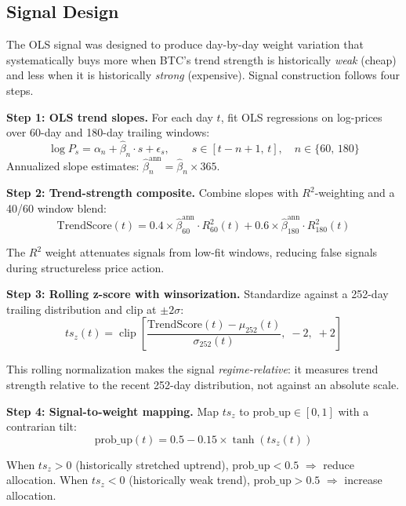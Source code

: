 \documentclass[11pt,letterpaper]{article}
\begin{document}
\subsection{Signal Design}

The OLS signal was designed to produce day-by-day weight variation that
systematically buys more when BTC's trend strength is historically \emph{weak}
(cheap) and less when it is historically \emph{strong} (expensive).  Signal
construction follows four steps.

\textbf{Step 1: OLS trend slopes.}  For each day $t$, fit OLS regressions on
log-prices over 60-day and 180-day trailing windows:
\begin{equation}
  \log P_s = \alpha_n + \hat{\beta}_n \cdot s + \epsilon_s,
  \qquad s \in [t-n+1,\, t],\quad n \in \{60,\, 180\}
\end{equation}
Annualized slope estimates: $\hat{\beta}_n^{\text{ann}} = \hat{\beta}_n \times 365$.

\textbf{Step 2: Trend-strength composite.}  Combine slopes with $R^2$-weighting
and a 40/60 window blend:
\begin{equation}
  \text{TrendScore}(t)
    = 0.4 \times \hat{\beta}_{60}^{\text{ann}} \cdot R^2_{60}(t)
    + 0.6 \times \hat{\beta}_{180}^{\text{ann}} \cdot R^2_{180}(t)
  \label{eq:trendscore}
\end{equation}

The $R^2$ weight attenuates signals from low-fit windows, reducing false signals
during structureless price action.

\textbf{Step 3: Rolling z-score with winsorization.}  Standardize against a
252-day trailing distribution and clip at $\pm2\sigma$:
\begin{equation}
  ts_z(t) = \operatorname{clip}\!\left[
    \frac{\text{TrendScore}(t) - \mu_{252}(t)}{\sigma_{252}(t)},\;
    -2,\; +2\right]
  \label{eq:tsz}
\end{equation}

This rolling normalization makes the signal \emph{regime-relative}: it measures
trend strength relative to the recent 252-day distribution, not against an
absolute scale.

\textbf{Step 4: Signal-to-weight mapping.}  Map $ts_z$ to $\text{prob\_up}
\in [0,1]$ with a contrarian tilt:
\begin{equation}
  \text{prob\_up}(t) = 0.5 - 0.15 \times \tanh(ts_z(t))
  \label{eq:prob_up}
\end{equation}

When $ts_z > 0$ (historically stretched uptrend), $\text{prob\_up} < 0.5$
$\Rightarrow$ reduce allocation.  When $ts_z < 0$ (historically weak trend),
$\text{prob\_up} > 0.5$ $\Rightarrow$ increase allocation.
\end{document}
